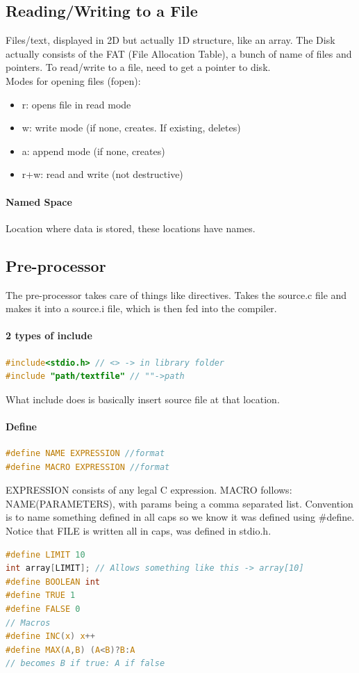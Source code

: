 \documentclass[12 pt]{article}
\begin{document}
\subsection{Reading/Writing to a File}
Files/text, displayed in 2D but actually 1D structure, like an array. The Disk actually consists of the FAT (File Allocation Table), a bunch of name of files and pointers. To read/write to a file, need to get a pointer to disk.
\\ Modes for opening files (fopen):
\begin{itemize}
\item r: opens file in read mode
\item w: write mode (if none, creates. If existing, deletes)
\item a: append mode (if none, creates)
\item r+w: read and write (not destructive)
\end{itemize}

\paragraph{Named Space}
Location where data is stored, these locations have names.
\subsection{Pre-processor}
The pre-processor takes care of things like directives. Takes the source.c file and makes it into a source.i file, which is then fed into the compiler.
\paragraph{2 types of include}
\begin{lstlisting}[language=c]
#include<stdio.h> // <> -> in library folder
#include "path/textfile" // ""->path
\end{lstlisting}
What include does is basically insert source file at that location.
\paragraph{Define}
\begin{lstlisting}[language=c]
#define NAME EXPRESSION //format
#define MACRO EXPRESSION //format
\end{lstlisting}
EXPRESSION consists of any legal C expression. MACRO follows: NAME(PARAMETERS), with params being a comma separated list. Convention is to name something defined in all caps so we know it was defined using \#define. Notice that FILE is written all in caps, was defined in stdio.h. 
\begin{lstlisting}[language=c]
#define LIMIT 10
int array[LIMIT]; // Allows something like this -> array[10]
#define BOOLEAN int
#define TRUE 1
#define FALSE 0
// Macros
#define INC(x) x++
#define MAX(A,B) (A<B)?B:A
// becomes B if true: A if false
\end{lstlisting}
\end{document}
